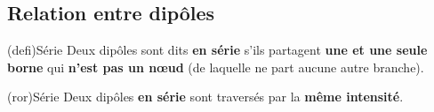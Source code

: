 \documentclass[../../main/main.tex]{subfiles}
\begin{document}
\begin{tcb}[label=def:convrg, sidebyside, righthand width=.3\linewidth]
\begin{center}
{		}
	\end{center}
\end{tcb}

\subsection{Relation entre dipôles}
\begin{tcb}[sidebyside, righthand ratio=.4](defi){Série}
	Deux dipôles sont dits \textbf{en série} s'ils partagent \textbf{une et une
		seule borne} qui \textbf{n'est pas un nœud} (de laquelle ne part aucune
	autre branche).
	\tcblower
	\begin{center}
	\end{center}
\end{tcb}
\begin{tcb}[label=ror:serdiv, fontupper=\Large, cnt](ror){Série}
	Deux dipôles \textbf{en série} sont traversés par la \textbf{même
		intensité}.
\end{tcb}
\end{document}
